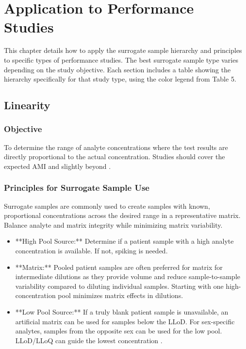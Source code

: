 \documentclass{article}
\begin{document}
\section{Application to Performance Studies}

This chapter details how to apply the surrogate sample hierarchy and principles to specific types of performance studies. The best surrogate sample type varies depending on the study objective. Each section includes a table showing the hierarchy specifically for that study type, using the color legend from Table 5.

\subsection{Linearity}

\subsubsection{Objective}
To determine the range of analyte concentrations where the test results are directly proportional to the actual concentration. Studies should cover the expected AMI and slightly beyond \cite{CLSIEP06}.

\subsubsection{Principles for Surrogate Sample Use}
Surrogate samples are commonly used to create samples with known, proportional concentrations across the desired range in a representative matrix. Balance analyte and matrix integrity while minimizing matrix variability.
\begin{itemize}
    \item **High Pool Source:** Determine if a patient sample with a high analyte concentration is available. If not, spiking is needed.
    \item **Matrix:** Pooled patient samples are often preferred for matrix for intermediate dilutions as they provide volume and reduce sample-to-sample variability compared to diluting individual samples. Starting with one high-concentration pool minimizes matrix effects in dilutions.
    \item **Low Pool Source:** If a truly blank patient sample is unavailable, an artificial matrix can be used for samples below the LLoD. For sex-specific analytes, samples from the opposite sex can be used for the low pool. LLoD/LLoQ can guide the lowest concentration \cite{CLSIEP17}.
\end{itemize}
\end{document}
